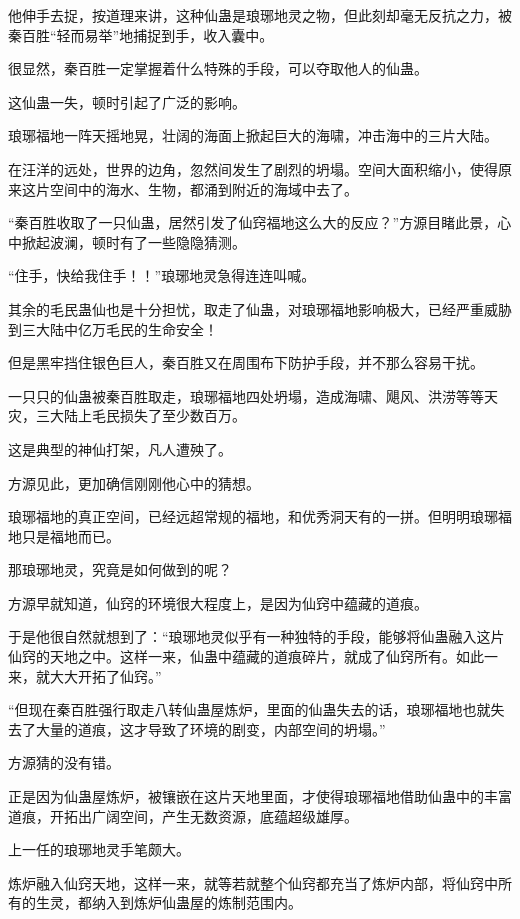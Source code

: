 \begin{this_body}
他伸手去捉，按道理来讲，这种仙蛊是琅琊地灵之物，但此刻却毫无反抗之力，被秦百胜“轻而易举”地捕捉到手，收入囊中。

很显然，秦百胜一定掌握着什么特殊的手段，可以夺取他人的仙蛊。

这仙蛊一失，顿时引起了广泛的影响。

琅琊福地一阵天摇地晃，壮阔的海面上掀起巨大的海啸，冲击海中的三片大陆。

在汪洋的远处，世界的边角，忽然间发生了剧烈的坍塌。空间大面积缩小，使得原来这片空间中的海水、生物，都涌到附近的海域中去了。

“秦百胜收取了一只仙蛊，居然引发了仙窍福地这么大的反应？”方源目睹此景，心中掀起波澜，顿时有了一些隐隐猜测。

“住手，快给我住手！！”琅琊地灵急得连连叫喊。

其余的毛民蛊仙也是十分担忧，取走了仙蛊，对琅琊福地影响极大，已经严重威胁到三大陆中亿万毛民的生命安全！

但是黑牢挡住银色巨人，秦百胜又在周围布下防护手段，并不那么容易干扰。

一只只的仙蛊被秦百胜取走，琅琊福地四处坍塌，造成海啸、飓风、洪涝等等天灾，三大陆上毛民损失了至少数百万。

这是典型的神仙打架，凡人遭殃了。

方源见此，更加确信刚刚他心中的猜想。

琅琊福地的真正空间，已经远超常规的福地，和优秀洞天有的一拼。但明明琅琊福地只是福地而已。

那琅琊地灵，究竟是如何做到的呢？

方源早就知道，仙窍的环境很大程度上，是因为仙窍中蕴藏的道痕。

于是他很自然就想到了：“琅琊地灵似乎有一种独特的手段，能够将仙蛊融入这片仙窍的天地之中。这样一来，仙蛊中蕴藏的道痕碎片，就成了仙窍所有。如此一来，就大大开拓了仙窍。”

“但现在秦百胜强行取走八转仙蛊屋炼炉，里面的仙蛊失去的话，琅琊福地也就失去了大量的道痕，这才导致了环境的剧变，内部空间的坍塌。”

方源猜的没有错。

正是因为仙蛊屋炼炉，被镶嵌在这片天地里面，才使得琅琊福地借助仙蛊中的丰富道痕，开拓出广阔空间，产生无数资源，底蕴超级雄厚。

上一任的琅琊地灵手笔颇大。

炼炉融入仙窍天地，这样一来，就等若就整个仙窍都充当了炼炉内部，将仙窍中所有的生灵，都纳入到炼炉仙蛊屋的炼制范围内。


\end{this_body}
